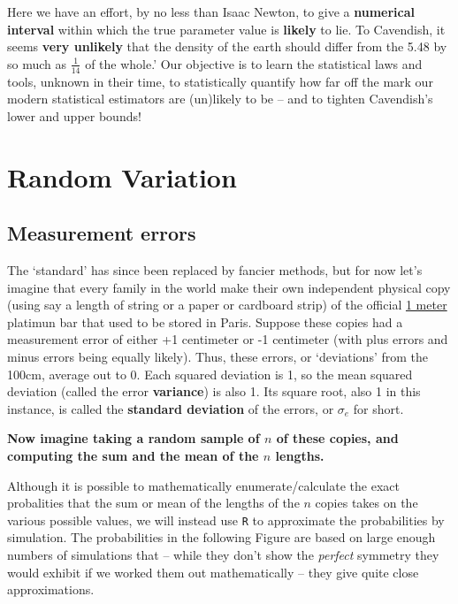 \documentclass[]{book}
\begin{document}
Here we have an effort, by no less than Isaac Newton, to give a \textbf{numerical interval} within which the true parameter value is \textbf{likely} to lie. To Cavendish, it seems \textbf{very unlikely} that the density of the earth should differ from the 5.48 by so much as \(\frac{1}{14}\) of the whole.' Our objective is to learn the statistical laws and tools, unknown in their time, to statistically quantify how far off the mark our modern statistical estimators are (un)likely to be -- and to tighten Cavendish's lower and upper bounds!

\hypertarget{random-variation}{%
\section{Random Variation}\label{random-variation}}

\hypertarget{measurement-errors-1}{%
\subsection{Measurement errors}\label{measurement-errors-1}}

The `standard' has since been replaced by fancier methods, but for now let's imagine that every family in the world make their own independent physical copy (using say a length of string or a paper or cardboard strip) of the official \href{https://en.wikipedia.org/wiki/History_of_the_metre}{1 meter} platimun bar that used to be stored in Paris. Suppose these copies had a measurement error of either +1 centimeter or -1 centimeter (with plus errors and minus errors being equally likely). Thus, these errors, or `deviations' from the 100cm, average out to 0. Each squared deviation is 1, so the mean squared deviation (called the error \textbf{variance}) is also 1. Its square root, also 1 in this instance, is called the \textbf{standard deviation} of the errors, or \(\sigma_{e}\) for short.

\textbf{Now imagine taking a random sample of \(n\) of these copies, and computing the sum and the mean of the \(n\) lengths.}

Although it is possible to mathematically enumerate/calculate the exact probalities that the sum or mean of the lengths of the \(n\) copies takes on the various possible values, we will instead use \texttt{R} to approximate the probabilities by simulation. The probabilities in the following Figure are based on large enough numbers of simulations that -- while they don't show the \emph{perfect} symmetry they would exhibit if we worked them out mathematically -- they give quite close approximations.
\end{document}
